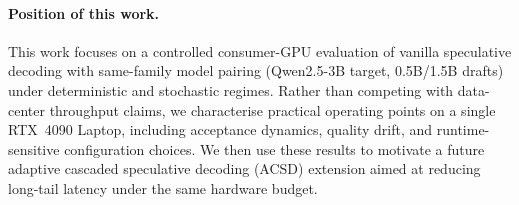 \paragraph{Position of this work.}
This work focuses on a controlled consumer-GPU evaluation of vanilla
speculative decoding with same-family model pairing (Qwen2.5-3B target,
0.5B/1.5B drafts) under deterministic and stochastic regimes. Rather than
competing with data-center throughput claims, we characterise practical
operating points on a single RTX~4090 Laptop, including acceptance dynamics,
quality drift, and runtime-sensitive configuration choices. We then use these
results to motivate a future adaptive cascaded speculative decoding (ACSD)
extension aimed at reducing long-tail latency under the same hardware budget.
